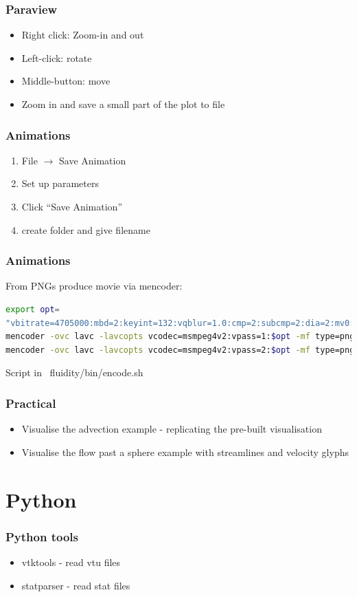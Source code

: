\documentclass[12pt]{beamer}
\begin{document}
\begin{frame}
    \frametitle{Paraview}
\begin{itemize}
\item Right click: Zoom-in and out
\item Left-click: rotate
\item Middle-button: move
\item Zoom in and save a small part of the plot to file
\end{itemize}
\end{frame}

\begin{frame}
	\frametitle{Animations}
\begin{enumerate}
\item File $\rightarrow$ Save Animation
\item Set up parameters
\item Click ``Save Animation''
\item create folder and give filename
\end{enumerate}
\end{frame}

\begin{frame}[fragile]
	\frametitle{Animations}
From PNGs produce movie via mencoder:
\vspace{5mm}
\begin{lstlisting}[language=bash]
export opt=
"vbitrate=4705000:mbd=2:keyint=132:vqblur=1.0:cmp=2:subcmp=2:dia=2:mv0:last_pred=3"
mencoder -ovc lavc -lavcopts vcodec=msmpeg4v2:vpass=1:$opt -mf type=png:fps=10 -nosound -o /dev/null mf://*.png
mencoder -ovc lavc -lavcopts vcodec=msmpeg4v2:vpass=2:$opt -mf type=png:fps=10 -nosound -o output.avi mf://*.png
\end{lstlisting}
\vspace{5mm}
Script in ~fluidity/bin/encode.sh
\end{frame}

\begin{frame}
	\frametitle{Practical}
\begin{itemize}
\item Visualise the advection example - replicating the pre-built visualisation
\item Visualise the flow past a sphere example with streamlines and velocity glyphs
\end{itemize}
\end{frame}



\section{Python}
\begin{frame}
    \frametitle{Python tools}
\begin{itemize}
\item vtktools - read vtu files 
\item statparser - read stat files
\end{itemize}
\end{frame}
\end{document}
